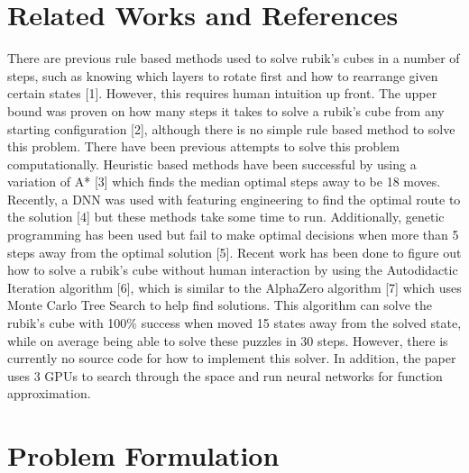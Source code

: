 \documentclass[10pt,twocolumn,letterpaper]{article}
\begin{document}

\section{Related Works and References}

There are previous rule based methods used to solve rubik’s cubes in a number of steps, such as knowing which layers to rotate first and how to rearrange given certain states [1]. However, this requires human intuition up front.  The upper bound was proven on how many steps it takes to solve a rubik’s cube from any starting configuration [2], although there is no simple rule based method to solve this problem. There have been previous attempts to solve this problem computationally. Heuristic based methods have been successful by using a variation of A* [3] which finds the median optimal steps away to be 18 moves. Recently, a DNN was used with featuring engineering to find the optimal route to the solution [4] but these methods take some time to run. Additionally, genetic programming has been used but fail to make optimal decisions when more than 5 steps away from the optimal solution [5]. Recent work has been done to figure out how to solve a rubik’s cube without human interaction by using the Autodidactic Iteration algorithm [6], which is similar to the AlphaZero algorithm [7] which uses Monte Carlo Tree Search to help find solutions. This algorithm can solve the rubik’s cube with 100\% success when moved 15 states away from the solved state, while on average being able to solve these puzzles in 30 steps. However, there is currently no source code for how to implement this solver. In addition, the paper uses 3 GPUs to search through the space and run neural networks for function approximation.


\section{Problem Formulation}
\end{document}
